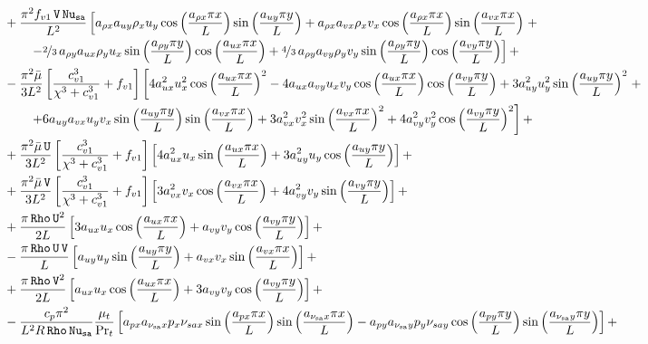 \documentclass[10pt]{article}
\newcommand{\Rho}{\,\mathtt{Rho}}
\newcommand{\U}{\,\mathtt{U}}
\newcommand{\V}{\,\mathtt{V}}
\newcommand{\Nu}{\,\mathtt{Nu_{sa}}}
\newcommand{\sa}{\nu_{\mathrm{sa}}}
\newcommand{\bmu}{\bar{\mu}}
\begin{document}
\begin{equation}
\begin{split}
&+\dfrac{\pi^2 f_{v1} \V \Nu}{L^2}\left[a_{\rho x} a_{uy} \rho_x u_y \cos\left(\dfrac{a_{\rho x} \pi x}{L}\right) \sin\left(\dfrac{a_{uy} \pi y}{L}\right)+a_{\rho x} a_{vx} \rho_x v_x \cos\left(\dfrac{a_{\rho x} \pi x}{L}\right) \sin\left(\dfrac{a_{vx} \pi x}{L}\right)\right.+\\
    &\qquad\left.-\nicefrac{2}{3}\, a_{\rho y} a_{ux} \rho_y u_x \sin\left(\dfrac{a_{\rho y} \pi y}{L}\right) \cos\left(\dfrac{a_{ux} \pi x}{L}\right)+\nicefrac{4}{3}\, a_{\rho y} a_{vy} \rho_y v_y \sin\left(\dfrac{a_{\rho y} \pi y}{L}\right) \cos\left(\dfrac{a_{vy} \pi y}{L}\right)\right] +\\
&-\dfrac{\pi^2 \bmu}{3L^2}\left[\dfrac{c_{v1}^3 }{\chi^3+c_{v1}^3}+f_{v1}\right] \left[4 a_{ux}^2 u_x^2 \cos\left(\dfrac{a_{ux} \pi x}{L}\right)^2-4 a_{ux} a_{vy} u_x v_y \cos\left(\dfrac{a_{ux} \pi x}{L}\right) \cos\left(\dfrac{a_{vy} \pi y}{L}\right)+3 a_{uy}^2 u_y^2 \sin\left(\dfrac{a_{uy} \pi y}{L}\right)^2\right.+\\
    &\qquad\left.+6 a_{uy} a_{vx} u_y v_x \sin\left(\dfrac{a_{uy} \pi y}{L}\right) \sin\left(\dfrac{a_{vx} \pi x}{L}\right)+3 a_{vx}^2 v_x^2 \sin\left(\dfrac{a_{vx} \pi x}{L}\right)^2+4 a_{vy}^2 v_y^2 \cos\left(\dfrac{a_{vy} \pi y}{L}\right)^2\right] +\\
&+ \dfrac{ \pi^2 \bmu \U}{3L^2}\left[\dfrac{c_{v1}^3 }{ \chi^3+c_{v1}^3} +f_{v1}\right] \left[4 a_{ux}^2 u_x \sin\left(\dfrac{a_{ux} \pi x}{L}\right)+3 a_{uy}^2 u_y \cos\left(\dfrac{a_{uy} \pi y}{L}\right)\right]+\\
&+ \dfrac{\pi^2 \bmu \V}{3L^2}\left[\dfrac{c_{v1}^3 }{ \chi^3+c_{v1}^3} +f_{v1}\right] \left[3 a_{vx}^2 v_x \cos\left(\dfrac{a_{vx} \pi x}{L}\right)+4 a_{vy}^2 v_y \sin\left(\dfrac{a_{vy} \pi y}{L}\right)\right] +\\
&+\dfrac{\pi \Rho \U^2}{2L} \left[3 a_{ux} u_x \cos\left(\dfrac{a_{ux} \pi x}{L}\right)+a_{vy} v_y \cos\left(\dfrac{a_{vy} \pi y}{L}\right)\right] +\\
&-\dfrac{\pi \Rho \U \V}{L}\left[a_{uy} u_y \sin\left(\dfrac{a_{uy} \pi y}{L}\right)+a_{vx} v_x \sin\left(\dfrac{a_{vx} \pi x}{L}\right)\right] +\\
&+\dfrac{ \pi \Rho \V^2}{2L} \left[a_{ux} u_x \cos\left(\dfrac{a_{ux} \pi x}{L}\right)+3 a_{vy} v_y \cos\left(\dfrac{a_{vy} \pi y}{L}\right)\right]+\\
&- \dfrac{c_p \pi^2}{L^2 R \Rho \Nu}\dfrac{\mu_t}{\Pr_t}\left[a_{px} a_{\sa x} p_x \nu_{sa x} \sin\left(\dfrac{a_{px} \pi x}{L}\right) \sin\left(\dfrac{a_{\sa x} \pi x}{L}\right)-a_{py} a_{\sa y} p_y \nu_{sa y} \cos\left(\dfrac{a_{py} \pi y}{L}\right) \sin\left(\dfrac{a_{\sa y} \pi y}{L}\right)\right]+\\

\end{split}
\end{equation}
\end{document}

